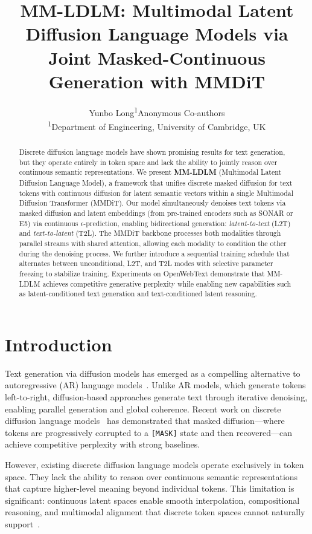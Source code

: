 \documentclass{article}
\title{MM-LDLM: Multimodal Latent Diffusion Language Models via Joint Masked-Continuous Generation with MMDiT}
\author{
Yunbo Long\textsuperscript{1}\hquad Anonymous Co-authors \\
\textsuperscript{1}Department of Engineering, University of Cambridge, UK \\
}
\begin{document}
\maketitle

\begin{abstract}
Discrete diffusion language models have shown promising results for text generation, but they operate entirely in token space and lack the ability to jointly reason over continuous semantic representations. We present \textbf{MM-LDLM} (Multimodal Latent Diffusion Language Model), a framework that unifies discrete masked diffusion for text tokens with continuous diffusion for latent semantic vectors within a single Multimodal Diffusion Transformer (MMDiT). Our model simultaneously denoises text tokens via masked diffusion and latent embeddings (from pre-trained encoders such as SONAR or E5) via continuous $\epsilon$-prediction, enabling bidirectional generation: \emph{latent-to-text} (L2T) and \emph{text-to-latent} (T2L). The MMDiT backbone processes both modalities through parallel streams with shared attention, allowing each modality to condition the other during the denoising process. We further introduce a sequential training schedule that alternates between unconditional, L2T, and T2L modes with selective parameter freezing to stabilize training. Experiments on OpenWebText demonstrate that MM-LDLM achieves competitive generative perplexity while enabling new capabilities such as latent-conditioned text generation and text-conditioned latent reasoning.
\end{abstract}

\section{Introduction}\label{sec:introduction}

Text generation via diffusion models has emerged as a compelling alternative to autoregressive (AR) language models~\citep{li2022diffusionlm, austin2021d3pm}. Unlike AR models, which generate tokens left-to-right, diffusion-based approaches generate text through iterative denoising, enabling parallel generation and global coherence. Recent work on discrete diffusion language models~\citep{lou2024mdlm, sahoo2024simple, gulrajani2024hdlm} has demonstrated that masked diffusion---where tokens are progressively corrupted to a \texttt{[MASK]} state and then recovered---can achieve competitive perplexity with strong baselines.

However, existing discrete diffusion language models operate exclusively in token space. They lack the ability to reason over continuous semantic representations that capture higher-level meaning beyond individual tokens. This limitation is significant: continuous latent spaces enable smooth interpolation, compositional reasoning, and multimodal alignment that discrete token spaces cannot naturally support~\citep{lovelace2024latent, rombach2022ldm}.
\end{document}
